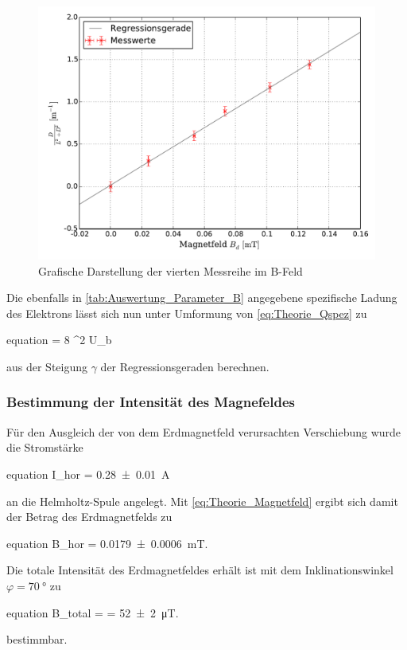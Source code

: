		\begin{figure}[!h]
		\centering
			\includegraphics[scale=0.7]{Grafiken/BFeld_Messreihe_IV.pdf}
			\caption{Grafische Darstellung der vierten Messreihe im B-Feld}\label{fig:Auswertung_Messdaten_II_IV}
		\end{figure}

		Die ebenfalls in \cref{tab:Auswertung_Parameter_B} angegebene spezifische Ladung des Elektrons lässt sich nun unter Umformung von \cref{eq:Theorie_Qspez} zu 
		\begin{empheq}{equation} 
			 = 8 \cdot \gamma^{2} \cdot U_{b}  
		\end{empheq}	
		aus der Steigung $\gamma$ der Regressionsgeraden berechnen.
		
	\subsubsection{Bestimmung der Intensität des Magnefeldes}
	
		Für den Ausgleich der von dem Erdmagnetfeld verursachten Verschiebung wurde die Stromstärke
 		\begin{empheq}{equation}
 			I_{hor} = \SI{0.28(1)}{\ampere}
 		\end{empheq}
		an die Helmholtz-Spule angelegt. Mit \cref{eq:Theorie_Magnetfeld} 
		ergibt sich damit der Betrag des Erdmagnetfelds zu 
 		\begin{empheq}{equation}
 			B_{hor} = \SI{0.0179(6)}{\milli\tesla}.
 		\end{empheq}
 		
 		Die totale Intensität des Erdmagnetfeldes erhält ist mit dem Inklinationswinkel 
 		$\varphi = \SI{70}{\degree}$ zu
 		\begin{empheq}{equation}
 			\label{eq:Auswertung_Btotal}
 			B_{total} =  = \SI{52(2)}{\micro\tesla}.
 		\end{empheq}
 		bestimmbar.
